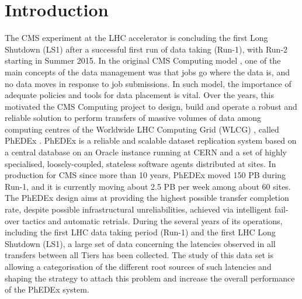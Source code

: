 \section{Introduction}
\label{sec:intro}

The CMS experiment \cite{CMS} at the LHC accelerator is concluding the
first Long Shutdown (LS1) after a successful first run of data taking
(Run-1), with Run-2 starting in Summer 2015. In the original CMS
Computing model \cite{CompModel}, one of the main concepts of the data
management \cite{DataMgmt} was that jobs go where the data is, and no
data moves in response to job submissions. In such model, the
importance of adequate policies and tools for data placement is
vital. Over the years, this motivated the CMS Computing project to
design, build and operate a robust and reliable solution to perform
transfers of massive volumes of data among computing centres of the
Worldwide LHC Computing Grid (WLCG) \cite{WLCG,WLCG2}, called PhEDEx
\cite{PhEDEx1, PhEDEx2, PhEDEx3, PhEDEx4}. PhEDEx is a reliable and
scalable dataset replication system based on a central database on an
Oracle instance running at CERN and a set of highly specialised,
loosely-coupled, stateless software agents distributed at sites. In
production for CMS since more than 10 years, PhEDEx moved 150 PB
during Run-1, and it is currently moving about 2.5 PB per week among
about 60 sites.  The PhEDEx design aims at providing the highest
possible transfer completion rate, despite possible infrastructural
unreliabilities, achieved via intelligent fail-over tactics and
automatic retrials. During the several years of its operations,
including the first LHC data taking period (Run-1) and the first LHC
Long Shutdown (LS1), a large set of data concerning the latencies
observed in all transfers between all Tiers has been collected. The
study of this data set is allowing a categorisation of the different
root sources of such latencies and shaping the strategy to attach this
problem and increase the overall performance of the PhEDEx system.
